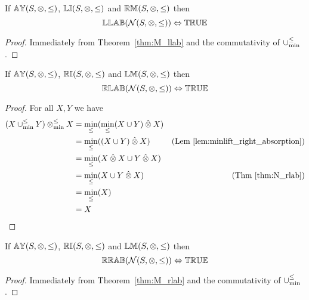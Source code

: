 \begin{theorem} \label{thm:M_lrab}
If ${\mathbb{AY}}(S,\otimes,\leq)$, ${\mathbb{LI}}(S,\otimes,\leq)$ and ${\mathbb{RM}}(S,\otimes,\leq)$ then
\begin{equation*}
{\mathbb{LLAB}}(\mathcal{N}(S,\otimes,\leq)) \Leftrightarrow {\mathbb{TRUE}}
\end{equation*}
\end{theorem}


\begin{proof}

\vspace{0.5em}
Immediately from Theorem~\ref{thm:M_llab} and the commutativity of $\mathbin{\cup_{\min}^{\leq}}$.
\end{proof}



\begin{theorem} \label{thm:M_rlab}
If ${\mathbb{AY}}(S,\otimes,\leq)$, ${\mathbb{RI}}(S,\otimes,\leq)$ and ${\mathbb{LM}}(S,\otimes,\leq)$ then
\begin{equation*}
{\mathbb{RLAB}}(\mathcal{N}(S,\otimes,\leq)) \Leftrightarrow {\mathbb{TRUE}}
\end{equation*}
\end{theorem}


\begin{proof}

\vspace{0.5em}
For all $X, Y$ we have
\begin{align*}
(X \mathbin{\cup_{\min}^{\leq}} Y) \mathbin{\otimes_{\min}^{\leq}} X 	& = \min_\leq(\min_\leq(X \cup Y) \mathbin{\hat{\otimes}} X) \\
							& = \min_\leq((X \cup Y) \mathbin{\hat{\otimes}} X) & \text{(Lem \ref{lem:minlift_right_absorption})} \\
							& = \min_\leq(X \mathbin{\hat{\otimes}} X \cup Y \mathbin{\hat{\otimes}} X) \\
							& = \min_\leq(X \cup Y \mathbin{\hat{\otimes}} X) & \text{(Thm \ref{thm:N_rlab})} \\
							& = \min_\leq(X) \\
							& = X
\end{align*}
\end{proof}




\begin{theorem} \label{thm:M_rrab}
If ${\mathbb{AY}}(S,\otimes,\leq)$, ${\mathbb{RI}}(S,\otimes,\leq)$ and ${\mathbb{LM}}(S,\otimes,\leq)$ then
\begin{equation*}
{\mathbb{RRAB}}(\mathcal{N}(S,\otimes,\leq)) \Leftrightarrow {\mathbb{TRUE}}
\end{equation*}
\end{theorem}


\begin{proof}

\vspace{0.5em}
Immediately from Theorem~\ref{thm:M_rlab} and the commutativity of $\mathbin{\cup_{\min}^{\leq}}$.
\end{proof}
